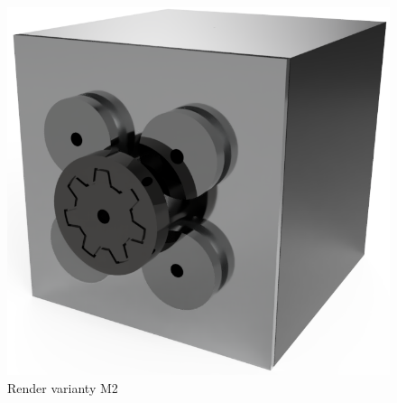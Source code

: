 \begin{figure}[htbp]
    \centering
    \includegraphics[width=\textwidth]{kapitoly/obrazky/M2/predni_render.PNG}
    \caption{Render varianty M2}
    \label{fig:M1.0}
\end{figure}


\newpage